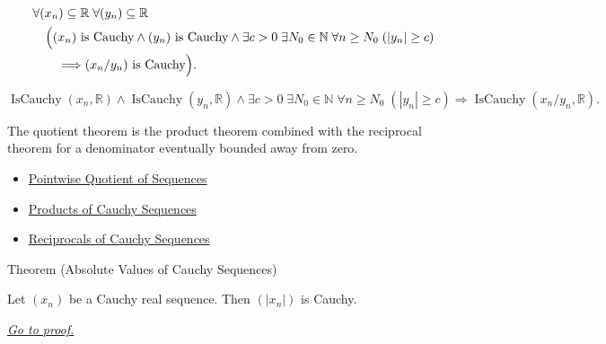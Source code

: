 \begin{remark*}
\[
\begin{aligned}
&\forall (x_n)\subseteq\mathbb{R}\;\forall (y_n)\subseteq\mathbb{R}\\
&\quad
\Bigl(
  (x_n)\text{ is Cauchy}
  \land
  (y_n)\text{ is Cauchy}
  \land
  \exists c>0\;\exists N_0\in\mathbb{N}\;\forall n\ge N_0\;( |y_n|\ge c )\\
&\qquad\Longrightarrow
  (x_n/y_n)\text{ is Cauchy}
\Bigr).
\end{aligned}
\]
\end{remark*}

\begin{remark*}
\[
\operatorname{IsCauchy}(x_n,\mathbb{R})
\land
\operatorname{IsCauchy}(y_n,\mathbb{R})
\land
\exists c>0\;\exists N_0\in\mathbb{N}\;\forall n\ge N_0\;( |y_n|\ge c )
\Longrightarrow
\operatorname{IsCauchy}(x_n/y_n,\mathbb{R}).
\]
\end{remark*}

\begin{remark*}[Interpretation]
The quotient theorem is the product theorem combined with the reciprocal
theorem for a denominator eventually bounded away from zero.
\end{remark*}

\begin{dependencies}
\begin{itemize}
  \item \hyperref[def:pointwise-quotient-sequence]{Pointwise Quotient of Sequences}
  \item \hyperref[thm:product-cauchy-sequences]{Products of Cauchy Sequences}
  \item \hyperref[thm:reciprocal-cauchy-sequence]{Reciprocals of Cauchy Sequences}
\end{itemize}
\end{dependencies}


\begin{theorembox}{Theorem (Absolute Values of Cauchy Sequences)}
\begin{theorem}
\label{thm:absolute-value-cauchy-sequence}
Let $(x_n)$ be a Cauchy real sequence. Then $(|x_n|)$ is Cauchy.

\smallskip
\noindent
\hyperref[prf:absolute-value-cauchy-sequence]{\textit{Go to proof.}}
\end{theorem}
\end{theorembox}

